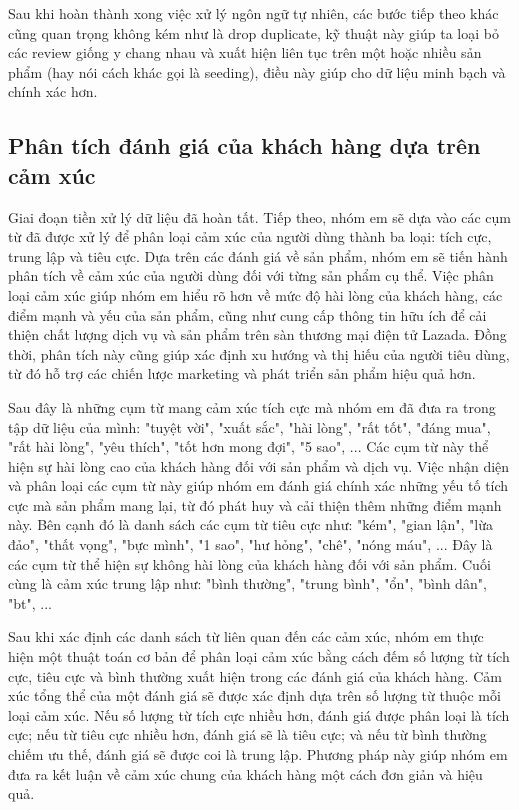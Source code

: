 Sau khi hoàn thành xong việc xử lý ngôn ngữ tự nhiên, các bước tiếp theo khác cũng quan trọng không kém như là drop duplicate, kỹ thuật này giúp ta loại bỏ các review giống y chang nhau và xuất hiện liên tục trên một hoặc nhiều sản phẩm (hay nói cách khác gọi là seeding), điều này giúp cho dữ liệu minh bạch và chính xác hơn.

\subsection{Phân tích đánh giá của khách hàng dựa trên cảm xúc}

Giai đoạn tiền xử lý dữ liệu đã hoàn tất. Tiếp theo, nhóm em sẽ dựa vào các cụm từ đã được xử lý để phân loại cảm xúc của người dùng thành ba loại: tích cực, trung lập và tiêu cực. Dựa trên các đánh giá về sản phẩm, nhóm em sẽ tiến hành phân tích về cảm xúc của người dùng đối với từng sản phẩm cụ thể. Việc phân loại cảm xúc giúp nhóm em hiểu rõ hơn về mức độ hài lòng của khách hàng, các điểm mạnh và yếu của sản phẩm, cũng như cung cấp thông tin hữu ích để cải thiện chất lượng dịch vụ và sản phẩm trên sàn thương mại điện tử Lazada. Đồng thời, phân tích này cũng giúp xác định xu hướng và thị hiếu của người tiêu dùng, từ đó hỗ trợ các chiến lược marketing và phát triển sản phẩm hiệu quả hơn.

Sau đây là những cụm từ mang cảm xúc tích cực mà nhóm em đã đưa ra trong tập dữ liệu của mình: "tuyệt vời", "xuất sắc", "hài lòng", "rất tốt", "đáng mua", "rất hài lòng", "yêu thích", "tốt hơn mong đợi", "5 sao", ... Các cụm từ này thể hiện sự hài lòng cao của khách hàng đối với sản phẩm và dịch vụ. Việc nhận diện và phân loại các cụm từ này giúp nhóm em đánh giá chính xác những yếu tố tích cực mà sản phẩm mang lại, từ đó phát huy và cải thiện thêm những điểm mạnh này. Bên cạnh đó là danh sách các cụm từ tiêu cực như: "kém", "gian lận", "lừa đảo", "thất vọng", "bực mình", "1 sao", "hư hỏng", "chê", "nóng máu", ... Đây là các cụm từ thể hiện sự không hài lòng của khách hàng đối với sản phẩm. Cuối cùng là cảm xúc trung lập như: "bình thường", "trung bình", "ổn", "bình dân", "bt", ...

Sau khi xác định các danh sách từ liên quan đến các cảm xúc, nhóm em thực hiện một thuật toán cơ bản để phân loại cảm xúc bằng cách đếm số lượng từ tích cực, tiêu cực và bình thường xuất hiện trong các đánh giá của khách hàng. Cảm xúc tổng thể của một đánh giá sẽ được xác định dựa trên số lượng từ thuộc mỗi loại cảm xúc. Nếu số lượng từ tích cực nhiều hơn, đánh giá được phân loại là tích cực; nếu từ tiêu cực nhiều hơn, đánh giá sẽ là tiêu cực; và nếu từ bình thường chiếm ưu thế, đánh giá sẽ được coi là trung lập. Phương pháp này giúp nhóm em đưa ra kết luận về cảm xúc chung của khách hàng một cách đơn giản và hiệu quả.

